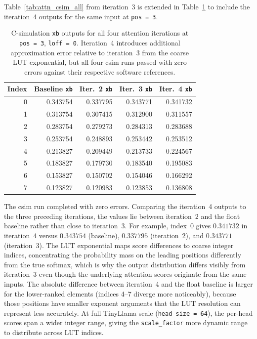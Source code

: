 Table~\ref{tab:attn_csim_all} from iteration~3 is extended in
Table~\ref{tab:attn_csim_all_iter4} to include the iteration~4 outputs for
the same input at \texttt{pos\,=\,3}.

\begin{table}[H]
  \centering
  \begin{tabular}{rrrrr}
    \toprule
    Index & Baseline \texttt{xb} & Iter.~2 \texttt{xb} & Iter.~3 \texttt{xb} & Iter.~4 \texttt{xb} \\
    \midrule
    0 & 0.343754 & 0.337795 & 0.343771 & 0.341732 \\
    1 & 0.313754 & 0.307415 & 0.312900 & 0.311557 \\
    2 & 0.283754 & 0.279273 & 0.284313 & 0.283688 \\
    3 & 0.253754 & 0.248893 & 0.253442 & 0.253512 \\
    4 & 0.213827 & 0.209449 & 0.213733 & 0.224567 \\
    5 & 0.183827 & 0.179730 & 0.183540 & 0.195083 \\
    6 & 0.153827 & 0.150702 & 0.154046 & 0.166292 \\
    7 & 0.123827 & 0.120983 & 0.123853 & 0.136808 \\
    \bottomrule
  \end{tabular}
  \caption{C-simulation \texttt{xb} outputs for all four attention iterations
           at \texttt{pos\,=\,3}, \texttt{loff\,=\,0}. Iteration~4 introduces
           additional approximation error relative to iteration~3 from the
           coarse LUT exponential, but all four csim runs passed with zero
           errors against their respective software references.}
  \label{tab:attn_csim_all_iter4}
\end{table}

The csim run completed with zero errors. Comparing the iteration~4 outputs
to the three preceding iterations, the values lie between iteration~2 and
the float baseline rather than close to iteration~3. For example, index~0
gives $0.341732$ in iteration~4 versus $0.343754$ (baseline), $0.337795$
(iteration~2), and $0.343771$ (iteration~3). The LUT exponential maps score
differences to coarse integer indices, concentrating the probability mass on
the leading positions differently from the true softmax, which is why the
output distribution differs visibly from iteration~3 even though the
underlying attention scores originate from the same inputs. The absolute
difference between iteration~4 and the float baseline is larger for the
lower-ranked elements (indices 4--7 diverge more noticeably), because those
positions have smaller exponent arguments that the LUT resolution can
represent less accurately. At full TinyLlama scale (\texttt{head\_size\,=\,64}),
the per-head scores span a wider integer range, giving the
\texttt{scale\_factor} more dynamic range to distribute across LUT indices.

